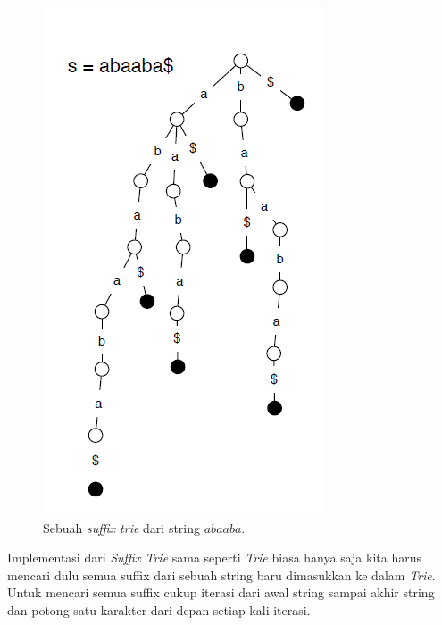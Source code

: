 	\begin{figure}
		\includegraphics[width=\textwidth,keepaspectratio]{fig/suffixTrie.png}%
		\caption{Sebuah \textit{suffix trie} dari string $abaaba$.}%
		\label{fig:suffixTrie}%
	\end{figure}

Implementasi dari \textit{Suffix Trie} sama seperti \textit{Trie} biasa hanya saja kita harus mencari dulu semua suffix dari sebuah string baru dimasukkan ke dalam \textit{Trie}. Untuk mencari semua suffix cukup iterasi dari awal string sampai akhir string dan potong satu karakter dari depan setiap kali iterasi.

